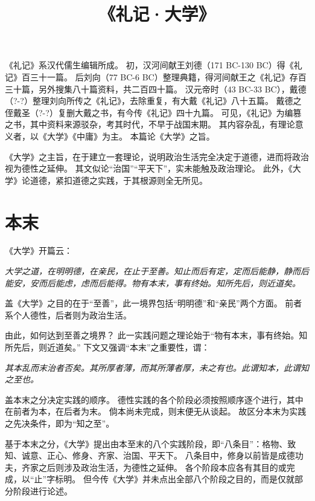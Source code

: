 \documentclass[11pt]{article}
\title{《礼记·大学》}
\date{}
\begin{document}
  \maketitle

  \linenumbers
《礼记》系汉代儒生编辑所成。
初，汉河间献王刘德（171 BC-130 BC）得《礼记》百三十一篇。
后刘向（77 BC-6 BC）整理典籍，得河间献王之《礼记》存百三十篇，另外搜集八十篇资料，共二百四十篇。
汉元帝时（43 BC-33 BC），戴德（?-?）整理刘向所传之《礼记》，去除重复，有大戴《礼记》八十五篇。
戴德之侄戴圣（?-?）复删大戴之书，有今传《礼记》四十九篇。
可见，《礼记》为编篡之书，其中资料来源驳杂，考其时代，不早于战国末期。
其内容杂乱，有理论意义者，以《大学》《中庸》为主。
本篇论《大学》之旨。

\par

《大学》之主旨，在于建立一套理论，说明政治生活完全决定于道德，进而将政治视为德性之延伸。
其文似论“治国”“平天下”，实未能触及政治理论。
此外，《大学》论道德，紧扣道德之实践，于其根源则全无所见。
  
\section{本末}
《大学》开篇云：
  
\textit{大学之道，在明明德，在亲民，在止于至善。知止而后有定，定而后能静，静而后能安，安而后能虑，虑而后能得。物有本末，事有终始。知所先后，则近道矣。}

盖《大学》之目的在于“至善”，此一境界包括“明明德”和“亲民”两个方面。
前者系个人德性，后者则为政治生活。

\par

由此，如何达到至善之境界？
此一实践问题之理论始于“物有本末，事有终始。知所先后，则近道矣。”
下文又强调“本末”之重要性，谓：

\textit{其本乱而末治者否矣。其所厚者薄，而其所薄者厚，未之有也。此谓知本，此谓知之至也。}
  
盖本末之分决定实践的顺序。
德性实践的各个阶段必须按照顺序逐个进行，其中在前者为本，在后者为末。
倘本尚未完成，则末便无从谈起。
故区分本末为实践之先决条件，即为“知之至”。

\par

基于本末之分，《大学》提出由本至末的八个实践阶段，即“八条目”：格物、致知、诚意、正心、修身、齐家、治国、平天下。
八条目中，修身以前皆是成德功夫，齐家之后则涉及政治生活，为德性之延伸。
各个阶段本应各有其目的或完成，以“止”字标明。
但今传《大学》并未点出全部八个阶段之目的，而是仅就部分阶段进行论述。
  
\end{document}
